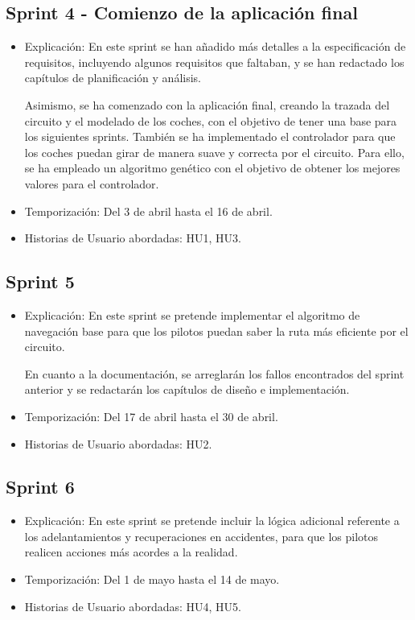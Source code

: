 \subsection{Sprint 4 - Comienzo de la aplicación final}
\begin{itemize}
    \item Explicación: En este sprint se han añadido más detalles a la especificación de requisitos, incluyendo algunos requisitos que faltaban, y se han redactado los capítulos de planificación y análisis.
    
    Asimismo, se ha comenzado con la aplicación final, creando la trazada del circuito y el modelado de los coches, con el objetivo de tener una base para los siguientes sprints. También se ha implementado el controlador para que los coches puedan girar de manera suave y correcta por el circuito. Para ello, se ha empleado un algoritmo genético con el objetivo de obtener los mejores valores para el controlador.

    \item Temporización: Del 3 de abril hasta el 16 de abril.
    \item Historias de Usuario abordadas: HU1, HU3.
\end{itemize}

\subsection{Sprint 5}
\begin{itemize}
    \item Explicación: En este sprint se pretende implementar el algoritmo de navegación base para que los pilotos puedan saber la ruta más eficiente por el circuito.


    En cuanto a la documentación, se arreglarán los fallos encontrados del sprint anterior y se redactarán los capítulos de diseño e implementación.

    \item Temporización: Del 17 de abril hasta el 30 de abril.
    \item Historias de Usuario abordadas: HU2.
\end{itemize}

\newpage

\subsection{Sprint 6}

\begin{itemize}
    \item Explicación: En este sprint se pretende incluir la lógica adicional referente a los adelantamientos y recuperaciones en accidentes, para que los pilotos realicen acciones más acordes a la realidad.
    

    \item Temporización: Del 1 de mayo hasta el 14 de mayo.
    \item Historias de Usuario abordadas: HU4, HU5.
\end{itemize}

